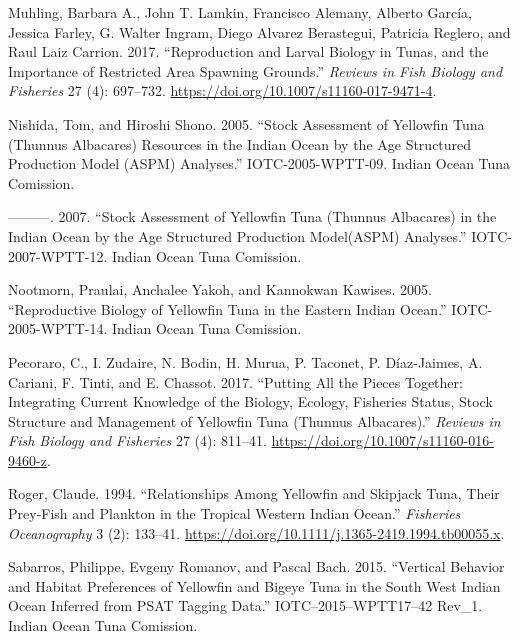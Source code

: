 \documentclass[
]{scrartcl}
\newlength{\cslhangindent}
\newenvironment{CSLReferences}[2] %
 {\begin{list}{}{%
  \setlength{\itemindent}{0pt}
  \setlength{\leftmargin}{0pt}
  \setlength{\parsep}{0pt}
  \ifodd #1
   \setlength{\leftmargin}{\cslhangindent}
   \setlength{\itemindent}{-1\cslhangindent}
  \fi
  \setlength{\itemsep}{#2\baselineskip}}}
 {\end{list}}
\begin{document}
\begin{CSLReferences}{1}{0}
Muhling, Barbara A., John T. Lamkin, Francisco Alemany, Alberto García,
Jessica Farley, G. Walter Ingram, Diego Alvarez Berastegui, Patricia
Reglero, and Raul Laiz Carrion. 2017. {``Reproduction and Larval Biology
in Tunas, and the Importance of Restricted Area Spawning Grounds.''}
\emph{Reviews in Fish Biology and Fisheries} 27 (4): 697--732.
\url{https://doi.org/10.1007/s11160-017-9471-4}.

Nishida, Tom, and Hiroshi Shono. 2005. {``Stock Assessment of Yellowfin
Tuna ({Thunnus} Albacares) Resources in the {Indian Ocean} by the Age
Structured Production Model ({ASPM}) Analyses.''} IOTC-2005-WPTT-09.
Indian Ocean Tuna Comission.

---------. 2007. {``Stock Assessment of Yellowfin Tuna ({Thunnus}
Albacares) in the {Indian Ocean} by the Age Structured Production
Model({ASPM}) Analyses.''} IOTC-2007-WPTT-12. Indian Ocean Tuna
Comission.

Nootmorn, Praulai, Anchalee Yakoh, and Kannokwan Kawises. 2005.
{``Reproductive Biology of Yellowfin Tuna in the Eastern {Indian
Ocean}.''} IOTC-2005-WPTT-14. Indian Ocean Tuna Comission.

Pecoraro, C., I. Zudaire, N. Bodin, H. Murua, P. Taconet, P.
Díaz-Jaimes, A. Cariani, F. Tinti, and E. Chassot. 2017. {``Putting All
the Pieces Together: Integrating Current Knowledge of the Biology,
Ecology, Fisheries Status, Stock Structure and Management of Yellowfin
Tuna ({Thunnus} Albacares).''} \emph{Reviews in Fish Biology and
Fisheries} 27 (4): 811--41.
\url{https://doi.org/10.1007/s11160-016-9460-z}.

Roger, Claude. 1994. {``Relationships Among Yellowfin and Skipjack Tuna,
Their Prey-Fish and Plankton in the Tropical Western {Indian Ocean}.''}
\emph{Fisheries Oceanography} 3 (2): 133--41.
\url{https://doi.org/10.1111/j.1365-2419.1994.tb00055.x}.

Sabarros, Philippe, Evgeny Romanov, and Pascal Bach. 2015. {``Vertical
Behavior and Habitat Preferences of Yellowfin and Bigeye Tuna in the
{South West Indian Ocean} Inferred from {PSAT} Tagging Data.''}
IOTC--2015--WPTT17--42 Rev\_1. Indian Ocean Tuna Comission.


\end{CSLReferences}
\end{document}
